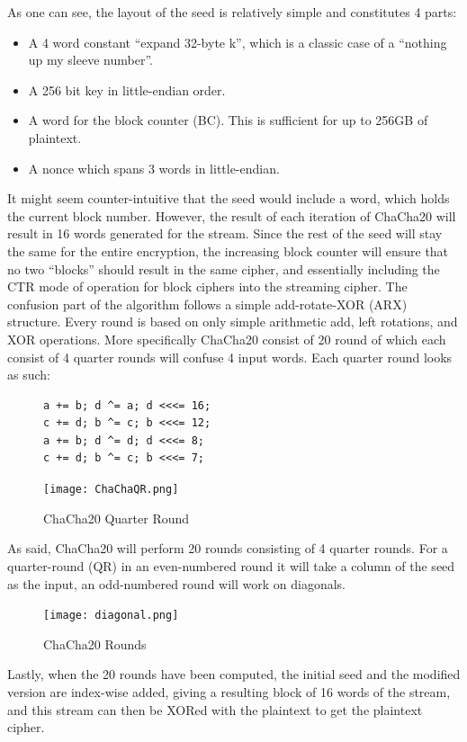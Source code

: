 \documentclass[a4paper, openany]{book}
\begin{document}
As one can see, the layout of the seed is relatively simple and constitutes 4 parts:
\begin{itemize}
\item A 4 word constant ``expand 32-byte k'', which is a classic case of a ``nothing up my sleeve number''.
\item A 256 bit key in little-endian order.
\item A word for the block counter (BC). This is sufficient for up to 256GB of plaintext.
\item A nonce which spans 3 words in little-endian.
\end{itemize}
It might seem counter-intuitive that the seed would include a word, which holds the current block number. However, the result of each iteration of ChaCha20 will result in 16 words generated for the stream. Since the rest of the seed will stay the same for the entire encryption, the increasing block counter will ensure that no two ``blocks'' should result in the same cipher, and essentially including the CTR mode of operation for block ciphers into the streaming cipher. The confusion part of the algorithm follows a simple add-rotate-XOR (ARX) structure. Every round is based on only simple arithmetic add, left rotations, and XOR operations. More specifically ChaCha20 consist of 20 round of which each consist of 4 quarter rounds will confuse 4 input words. Each quarter round looks as such:
\begin{figure}[H]
\begin{minipage}{0.4\textwidth}
\begin{verbatim}
a += b; d ^= a; d <<<= 16;
c += d; b ^= c; b <<<= 12;
a += b; d ^= d; d <<<= 8;
c += d; b ^= c; b <<<= 7;
\end{verbatim}
\end{minipage}
\qquad
\begin{minipage}{0.4\textwidth}
\texttt{[image: ChaChaQR.png]}
\end{minipage}
\caption{ChaCha20 Quarter Round}
\label{fig:ChaChaQR}
\end{figure}
As said, ChaCha20 will perform 20 rounds consisting of 4 quarter rounds. For a quarter-round (QR) in an even-numbered round it will take a column of the seed as the input, an odd-numbered round will work on diagonals.
\begin{figure}[H]
\centering
\texttt{[image: diagonal.png]}
\caption{ChaCha20 Rounds}
\label{fig:ChaChaRound}
\end{figure}

Lastly, when the 20 rounds have been computed, the initial seed and the modified version are index-wise added, giving a resulting block of 16 words of the stream, and this stream can then be XORed with the plaintext to get the plaintext cipher.
\end{document}
